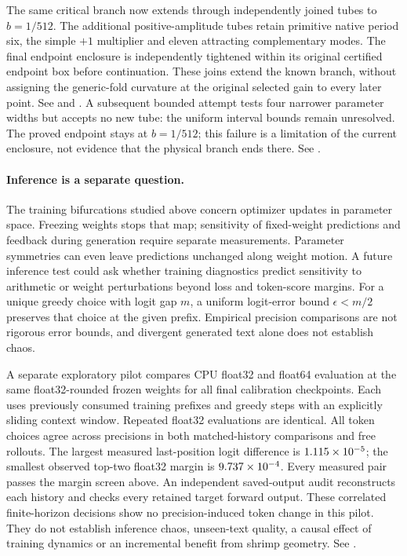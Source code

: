 \documentclass[11pt,letterpaper]{article}
\begin{document}
The same critical branch now extends through
\nRNNExtendedFoldTubes{} independently joined tubes to $b=1/512$.
The additional positive-amplitude tubes retain primitive native period six,
the simple $+1$ multiplier and eleven attracting complementary modes.
The final endpoint enclosure is independently tightened within its original
certified endpoint box before continuation. These joins extend the known
branch, without assigning the generic-fold curvature at the original
selected gain to every later point.
See  and
.
A subsequent bounded attempt tests four narrower parameter widths but
accepts no new tube: the uniform interval bounds remain unresolved.
The proved endpoint stays at $b=1/512$; this failure is a limitation of the
current enclosure, not evidence that the physical branch ends there.
See .

\paragraph{Inference is a separate question.} The training bifurcations studied above concern optimizer updates in parameter
space. Freezing weights stops that map; sensitivity of fixed-weight predictions and feedback during generation
require separate measurements. Parameter symmetries can even leave predictions unchanged along weight motion.
A future inference test could ask whether training diagnostics predict sensitivity to arithmetic or weight
perturbations beyond loss and token-score margins. For a unique greedy choice with logit gap $m$, a uniform
logit-error bound $\epsilon<m/2$ preserves that choice at the given prefix. Empirical precision comparisons
are not rigorous error bounds, and divergent generated text alone does not establish chaos.

A separate exploratory pilot compares CPU float32 and float64 evaluation at the
same float32-rounded frozen weights for all \nInferenceCases{} final calibration
checkpoints. Each uses \nInferencePrefixes{} previously consumed training prefixes
and \nInferenceSteps{} greedy steps with an explicitly sliding context window.
Repeated float32 evaluations are identical. All \nInferenceDecisions{} token
choices agree across precisions in both matched-history comparisons and free
rollouts. The largest measured last-position logit difference is
$1.115\times10^{-5}$; the smallest observed top-two float32 margin is
$9.737\times10^{-4}$. Every measured pair passes the margin screen above.
An independent saved-output audit reconstructs each history and checks every
retained target forward output. These correlated finite-horizon decisions
show no precision-induced token change in this pilot. They do not establish
inference chaos, unseen-text quality, a causal effect of training dynamics or
an incremental benefit from shrimp geometry. See
.
\end{document}
